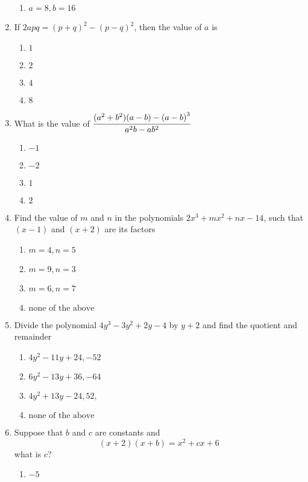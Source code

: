 \begin{multicols}{2}
\begin{enumerate}[label={\arabic*.}]
\begin{enumerate}[label={\Alph*.}]
        \item \(a = 8, b = 16\)
      \end{enumerate}
    \item If $2apq = (p+q)^2 - (p-q)^2$, then the value of $a$ is
      \begin{enumerate}[label={\Alph*.}]
        \item \(1\)
        \item \(2\)
        \item \(4\)
        \item \(8\)
      \end{enumerate}
    \item What is the value of $\cfrac{(a^2 + b^2)(a-b) - {(a-b)}^3}{a^2b - ab^2}$
      \begin{enumerate}[label={\Alph*.}]
        \item \(-1\)
        \item \(-2\)
        \item \(1\)
        \item \(2\)
      \end{enumerate}
    \item Find the value of $m$ and $n$ in the polynomials $2x^3 + mx^2 + nx -14$, such that $(x-1)$ and $(x+2)$ are its factors
      \begin{enumerate}[label={\Alph*.}]
        \item \(m = 4, n = 5\)
        \item \(m = 9, n =3\)
        \item \(m = 6, n = 7\)
        \item \( \text{none of the above}\)
      \end{enumerate}
    \item Divide the polynomial $4y^3 - 3y^2 + 2y -4 $ by $y + 2$ and find the quotient and remainder
      \begin{enumerate}[label={\Alph*.}]
        \item \(4y^2 - 11y + 24, -52\)
        \item \(6y^2 - 13y + 36 , -64\)
        \item \(4y^2 + 13y - 24, 52, \)
        \item \(\text{none of the above}\)
      \end{enumerate}
    \item Suppose that $b$ and $c$ are constants and \[(x+2)(x+b) = x^2 + cx + 6\] what is $c$?
      \begin{enumerate}[label={\Alph*.}]
        \item \(-5\)

\end{enumerate}
\end{enumerate}
\end{multicols}
